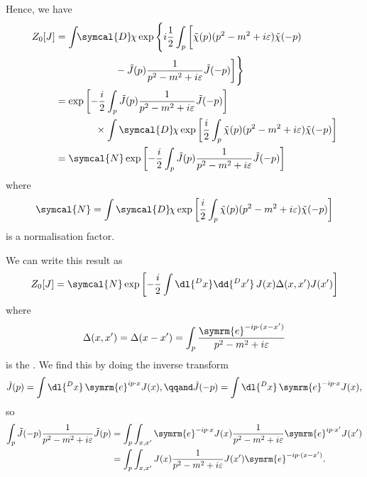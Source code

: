 \documentclass[fleqn]{NotesClass}
\newcommand{\e}{\symrm{e}}
\newcommand{\DL}[1]{\symcal{D}#1}
\begin{document}
    Hence, we have
    \begingroup
    \allowdisplaybreaks
    \begin{align}
        Z_0[J] &= \int \!\! \DL{\mkern-2mu\chi} \exp\Bigg\{ i\frac{1}{2}\int_p \bigg[ \tilde{\chi}(p)(p^2 - m^2 + i\varepsilon)\tilde{\chi}(-p)\\
        &\qquad\qquad\qquad- \tilde{J}(p) \frac{1}{p^2 - m^2 + i\varepsilon}\tilde{J}(-p) \bigg]  \Bigg\}\\
        &= \exp\left[ -\frac{i}{2} \int_p \tilde{J}(p) \frac{1}{p^2 - m^2 + i\varepsilon} \tilde{J}(-p) \right]\\
        &\qquad\qquad\times\int \DL{\mkern-2mu\chi} \exp\left[ \frac{i}{2} \int_p \tilde{\chi}(p)(p^2 - m^2 + i\varepsilon)\tilde{\chi}(-p) \right]\\
        &= \symcal{N} \exp\left[ -\frac{i}{2} \int_p \tilde{J}(p) \frac{1}{p^2 - m^2 + i\varepsilon} \tilde{J}(-p) \right]
    \end{align}
    \endgroup
    where
    \begin{equation}
        \symcal{N} = \int \DL{\mkern-2mu\chi} \exp\left[ \frac{i}{2} \int_p \tilde{\chi}(p)(p^2 - m^2 + i\varepsilon)\tilde{\chi}(-p) \right]
    \end{equation}
    is a normalisation factor.
    
    We can write this result as
    \begin{equation}
        Z_0[J] = \symcal{N}\exp\left[ -\frac{i}{2} \int \dl{^Dx} \dd{^Dx'} \, J(x) \Delta(x, x') J(x') \right]
    \end{equation}
    where
    \begin{equation}
        \Delta(x, x') = \Delta(x - x') = \int_p \frac{\e^{-ip\cdot (x - x')}}{p^2 - m^2 + i\varepsilon}
    \end{equation}
    is the .
    We find this by doing the inverse transform
    \begin{equation}
        \tilde{J}(p) = \int \dl{^Dx} \, \e^{ip\cdot x} J(x), \qqand \tilde{J}(-p) = \int \dl{^Dx} \, \e^{-ip\cdot x} J(x),
    \end{equation}
    so
    \begin{align*}
        \int_p \tilde{J}(-p) \frac{1}{p^2 - m^2 + i\varepsilon} \tilde{J}(p) &= \int_p \int_{x,x'} \e^{-ip\cdot x} J(x) \frac{1}{p^2 - m^2 + i\varepsilon} \e^{ip \cdot x'} J(x')\\
        &= \int_p \int_{x,x'} J(x)\frac{1}{p^2 - m^2 + i\varepsilon} J(x') \e^{-ip \cdot (x - x')}.
    \end{align*}
    
\end{document}
